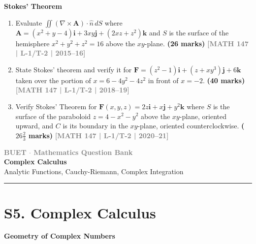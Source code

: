\documentclass[12pt,a4paper]{article}
\newcommand{\yr}[1]{\hfill\textcolor{gray}{\small\textbf{[#1]}}}
\newcommand{\mk}[1]{\textcolor{orange!70!black}{\small\textbf{(#1 marks)}}}
\newcommand{\subtopic}[2]{%
  \vspace{10pt}
  \noindent\begin{tcolorbox}[colback=#1!8,colframe=#1,boxrule=0.6pt,arc=4pt,
    left=6pt,right=6pt,top=4pt,bottom=4pt]
    \small\bfseries\textcolor{#1}{#2}
  \end{tcolorbox}
  \vspace{2pt}
}
\newcommand{\secdivider}[3]{%
  \newpage\thispagestyle{empty}%
  \vspace*{\fill}%
  \begin{tcolorbox}[enhanced,colback=#3!6,colframe=#3,boxrule=1.5pt,arc=8pt,
    left=20pt,right=20pt,top=22pt,bottom=22pt,
    shadow={3pt}{-3pt}{0pt}{black!15}]
    \centering
    {\large\textcolor{gray}{\textbf{BUET $\cdot$ Mathematics Question Bank}}}\\[8pt]
    {\fontsize{26}{32}\selectfont\bfseries\textcolor{#3}{#1}}\\[6pt]
    {\fontsize{15}{19}\selectfont\textcolor{dgray}{#2}}\\[12pt]
    \textcolor{#3!60}{\rule{0.5\textwidth}{0.5pt}}
  \end{tcolorbox}%
  \vspace*{\fill}\newpage%
}
\begin{document}
\subtopic{cD}{Stokes' Theorem}
\label{sub:s4-stokes}

\begin{enumerate}

\item Evaluate $\displaystyle\iint(\nabla\times\mathbf{A})\cdot\hat{n}\,dS$ where $\mathbf{A}=(x^{2}+y-4)\mathbf{i}+3xy\mathbf{j}+(2xz+z^{2})\mathbf{k}$ and $S$ is the surface of the hemisphere $x^{2}+y^{2}+z^{2}=16$ above the $xy$-plane.
\mk{26} \yr{MATH 147 | L-1/T-2 | 2015--16}

\item State Stokes' theorem and verify it for $\mathbf{F}=(z^{2}-1)\mathbf{i}+(z+xy^{3})\mathbf{j}+6\mathbf{k}$ taken over the portion of $x=6-4y^{2}-4z^{2}$ in front of $x=-2$.
\mk{40} \yr{MATH 147 | L-1/T-2 | 2018--19}

\item Verify Stokes' Theorem for $\mathbf{F}(x,y,z)=2z\mathbf{i}+x\mathbf{j}+y^{2}\mathbf{k}$ where $S$ is the surface of the paraboloid $z=4-x^{2}-y^{2}$ above the $xy$-plane, oriented upward, and $C$ is its boundary in the $xy$-plane, oriented counterclockwise.
\mk{$26\tfrac{2}{3}$} \yr{MATH 147 | L-1/T-2 | 2020--21}

\end{enumerate}


\secdivider{Complex Calculus}{Analytic Functions, Cauchy-Riemann, Complex Integration}{cE}

\section{S5. Complex Calculus}
\label{sec:S5}

\subtopic{cE}{Geometry of Complex Numbers}
\label{sub:s5-geometry}
\end{document}
